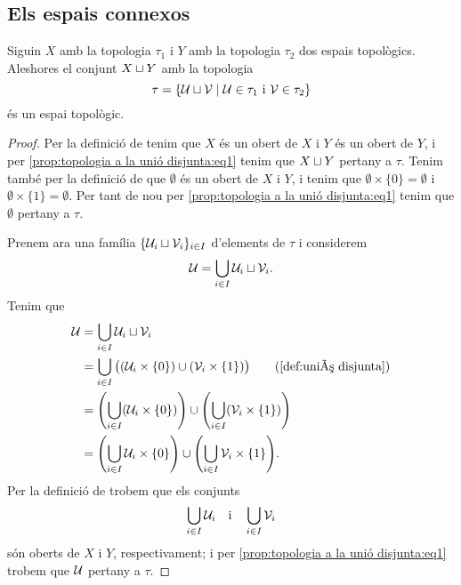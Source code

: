 \documentclass[../../Main.tex]{subfiles}
\begin{document}
	\subsection{Els espais connexos}
	\begin{proposition}
		\label{prop:topologia a la unió disjunta}
		Siguin \(X\) amb la topologia \(\tau_{1}\) i \(Y\) amb la topologia \(\tau_{2}\) dos espais topològics. Aleshores el conjunt \(X\mathbin{\sqcup} Y\) amb la topologia
		\begin{equation}
			\label{prop:topologia a la unió disjunta:eq1}
			\tau=\{\mathcal{U}\mathbin{\sqcup}\mathcal{V}\mid\mathcal{U}\in\tau_{1}\text{ i }\mathcal{V}\in\tau_{2}\}
		\end{equation}
		és un espai topològic.
		\begin{proof}
			Per la definició de  tenim que \(X\) és un obert de \(X\) i \(Y\) és un obert de \(Y\), i per \eqref{prop:topologia a la unió disjunta:eq1} tenim que \(X\mathbin{\sqcup} Y\) pertany a \(\tau\). Tenim també per la definició de  que \(\emptyset\) és un obert de \(X\) i \(Y\), i tenim que \(\emptyset\times\{0\}=\emptyset\) i \(\emptyset\times\{1\}=\emptyset\). Per tant de nou per \eqref{prop:topologia a la unió disjunta:eq1} tenim que \(\emptyset\) pertany a \(\tau\).
			
			Prenem ara una família \(\{\mathcal{U}_{i}\mathbin{\sqcup}\mathcal{V}_{i}\}_{i\in I}\) d'elements de \(\tau\) i considerem
			\[
			    \mathcal{U}=\bigcup_{i\in I}\mathcal{U}_{i}\mathbin{\sqcup}\mathcal{V}_{i}.
			\]
			Tenim que
			\begin{align*}
				\obert{U}&=\bigcup_{i\in I}\obert{U}_{i}\uniodisjunta\obert{V}_{i} \\
				&=\bigcup_{i\in I}\big((\obert{U}_{i}\times\{0\})\cup(\obert{V}_{i}\times\{1\})\big) \tag{\ref{def:unió disjunta}} \\
				&=\left(\bigcup_{i\in I}(\obert{U}_{i}\times\{0\})\right)\cup\left(\bigcup_{i\in I}(\obert{V}_{i}\times\{1\})\right) \\
				&=\left(\bigcup_{i\in I}\obert{U}_{i}\times\{0\}\right)\cup\left(\bigcup_{i\in I}\obert{V}_{i}\times\{1\}\right).
			\end{align*}
			Per la definició de  trobem que els conjunts
			\[
			    \bigcup_{i\in I}\mathcal{U}_{i}\quad\text{i}\quad\bigcup_{i\in I}\mathcal{V}_{i}
			\]
			són oberts de \(X\) i \(Y\), respectivament; i per \eqref{prop:topologia a la unió disjunta:eq1} trobem que \(\mathcal{U}\) pertany a \(\tau\).
			

\end{proof}
\end{proposition}
\end{document}

